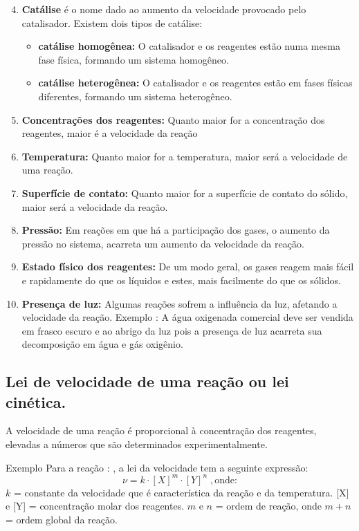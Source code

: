 \documentclass[10pt]{scrartcl}
\begin{document}
\begin{enumerate}\setcounter{enumi}{3}
\item \textbf{Catálise} é o nome dado ao aumento da velocidade provocado pelo catalisador. Existem dois tipos de catálise:
\begin{itemize}
\item \textbf{catálise homogênea:} O catalisador e os reagentes estão numa mesma fase física, formando um sistema homogêneo.
\end{itemize}
\begin{itemize}
\item \textbf{catálise heterogênea:} O catalisador e os reagentes estão em fases físicas diferentes, formando um sistema heterogêneo.
\end{itemize}
\item \textbf{Concentrações dos reagentes:} Quanto maior for a concentração dos reagentes, maior é a velocidade da reação
\item \textbf{Temperatura:} Quanto maior for a temperatura, maior será a velocidade de uma reação.
\item \textbf{Superfície de contato:} Quanto maior for a superfície de contato do sólido, maior será a velocidade da reação.
\item \textbf{Pressão:} Em reações em que há a participação dos gases, o aumento da pressão no sistema, acarreta um aumento da velocidade da reação.
\item \textbf{Estado físico dos reagentes:} De um modo geral, os gases reagem mais fácil e rapidamente do que os líquidos e estes, mais facilmente do que os sólidos.
\item \textbf{Presença de luz:} Algumas reações sofrem a influência da luz, afetando a velocidade da reação. Exemplo : A água oxigenada comercial deve ser vendida em frasco escuro e ao abrigo da luz pois a presença de luz acarreta sua decomposição em água e gás oxigênio.
\end{enumerate}
\subsection{Lei de velocidade de uma reação ou lei cinética.}
\label{sec:orgc8f7755}

A velocidade de uma reação é proporcional à concentração dos reagentes, elevadas a números que são determinados experimentalmente.

\begin{Box2}{Exemplo}
Para a reação :   , a lei da velocidade tem a seguinte expressão:
\begin{equation}
\nu = k\cdot[X]^m\cdot[Y]^n \; ,\text{onde:}
\end{equation}
\(k\) = constante da velocidade que é característica da reação e da temperatura.
{[}X] e [Y] = concentração molar dos reagentes.
\(m\) e \(n\) = ordem de reação, onde \(m + n\) = ordem global da reação.

\end{Box2}
\end{document}
